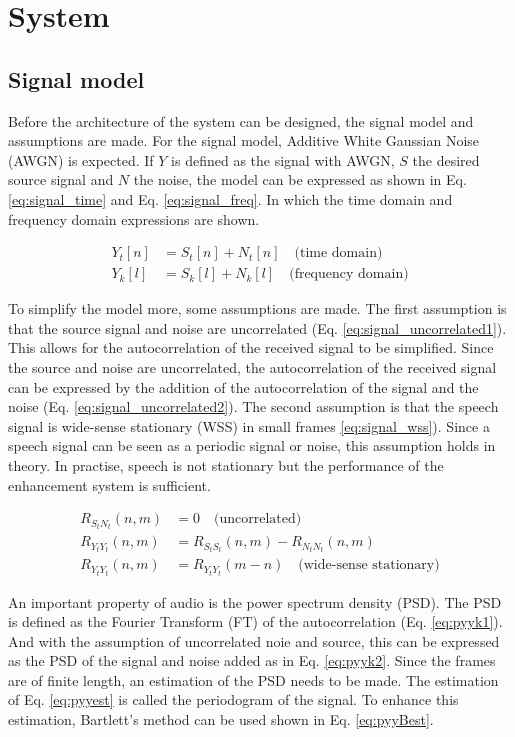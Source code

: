 \section{System} \label{sec:system}
\subsection{Signal model}
Before the architecture of the system can be designed, the signal model and assumptions are made. For the signal model, Additive White Gaussian Noise (AWGN) is expected. If $Y$ is defined as the signal with AWGN, $S$ the desired source signal and $N$ the noise, the model can be expressed as shown in Eq. \ref{eq:signal_time} and Eq. \ref{eq:signal_freq}. In which the time domain and frequency domain expressions are shown.

\begin{align}
  Y_{t}[n] &= S_{t}[n] + N_{t}[n] \quad \text{(time domain)}
  \label{eq:signal_time} \\
  Y_{k}[l] &= S_{k}[l] + N_{k}[l] \quad \text{(frequency domain)}
  \label{eq:signal_freq}
\end{align}

To simplify the model more, some assumptions are made. The first assumption is that the source signal and noise are uncorrelated (Eq. \ref{eq:signal_uncorrelated1}). This allows for the autocorrelation of the received signal to be simplified. Since the source and noise are uncorrelated, the autocorrelation of the received signal can be expressed by the addition of the autocorrelation of the signal and the noise (Eq. \ref{eq:signal_uncorrelated2}). The second assumption is that the speech signal is wide-sense stationary (WSS) in small frames \ref{eq:signal_wss}). Since a speech signal can be seen as a periodic signal or noise, this assumption holds in theory. In practise, speech is not stationary but the performance of the enhancement system is sufficient.

\begin{align}
  R_{S_{t}N_{t}}(n,m) &= 0 \quad \text{(uncorrelated)}
  \label{eq:signal_uncorrelated1} \\
  R_{Y_{t}Y_{t}}(n,m) &= R_{S_{t}S_{t}}(n,m) - R_{N_{t}N_{t}}(n,m)
  \label{eq:signal_uncorrelated2} \\
  R_{Y_{t}Y_{t}}(n,m) &= R_{Y_{t}Y_{t}}(m-n) \quad \text{(wide-sense stationary)}
  \label{eq:signal_wss}
\end{align}

An important property of audio is the power spectrum density (PSD). The PSD is defined as the Fourier Transform (FT) of the autocorrelation (Eq. \ref{eq:pyyk1}). And with the assumption of uncorrelated noie and source, this can be expressed as the PSD of the signal and noise added as in Eq. \ref{eq:pyyk2}. Since the frames are of finite length, an estimation of the PSD needs to be made. The estimation of Eq. \ref{eq:pyyest} is called the periodogram of the signal. To enhance this estimation, Bartlett's method can be used shown in Eq. \ref{eq:pyyBest}.

